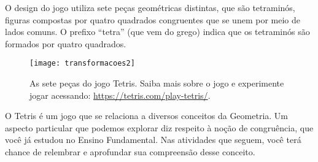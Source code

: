 O design do jogo utiliza sete peças geométricas distintas, que são tetraminós, figuras compostas por quatro quadrados congruentes que se unem por meio de lados comuns. O prefixo “tetra” (que vem do grego) indica que os tetraminós são formados por quatro quadrados. 

\begin{figure}[H]
\centering

\texttt{[image: transformacoes2]}
\caption{As sete peças do jogo Tetris. Saiba mais sobre o jogo e experimente jogar acessando: \url{https://tetris.com/play-tetris/}.}
\end{figure}

O Tetris é um jogo que se relaciona a diversos conceitos da Geometria. Um aspecto particular que podemos explorar diz respeito à noção de congruência, que você já estudou no Ensino Fundamental. Nas atividades que seguem, você terá chance de relembrar e aprofundar sua compreensão desse conceito.

